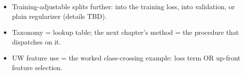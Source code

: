 \begin{itemize}
    \item Training-adjustable splits further: into the training loss, into validation, or plain regularizer (details TBD).
    \item Taxonomy = lookup table; the next chapter's method = the procedure that dispatches on it.
    \item UW feature use = the worked class-crossing example: loss term OR up-front feature selection. 

\end{itemize}
